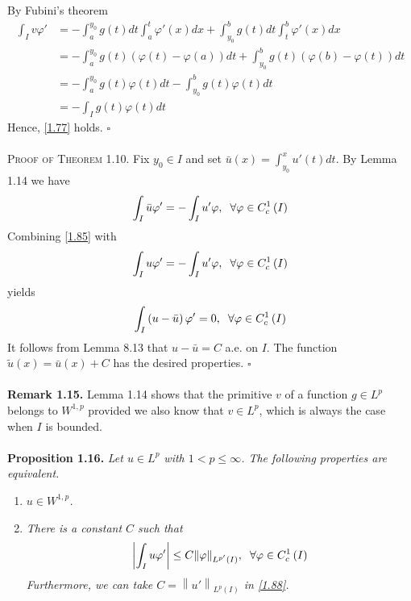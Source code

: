 \documentclass[a4paper,oneside]{article}
\numberwithin{equation}{section}
\begin{document}
By Fubini's theorem
\begin{align}
\int_I {v\varphi '}  &=  - \int_a^{{y_0}} {g\left( t \right)dt\int_a^t {\varphi '\left( x \right)dx} }  + \int_{{y_0}}^b {g\left( t \right)dt\int_t^b {\varphi '\left( x \right)dx} } \\
 &=  - \int_a^{{y_0}} {g\left( t \right)\left( {\varphi \left( t \right) - \varphi \left( a \right)} \right)dt}  + \int_{{y_0}}^b {g\left( t \right)\left( {\varphi \left( b \right) - \varphi \left( t \right)} \right)dt} \\
 &=  - \int_a^{{y_0}} {g\left( t \right)\varphi \left( t \right)dt}  - \int_{{y_0}}^b {g\left( t \right)\varphi \left( t \right)dt} \\
 &=  - \int_I {g\left( t \right)\varphi \left( t \right)dt} 
\end{align}
Hence, \eqref{1.77} holds. \hfill $\square$\\
\\
\textsc{Proof of Theorem 1.10.} Fix $y_0\in I$ and set $\bar u\left( x \right) = \int_{{y_0}}^x {u'\left( t \right)dt} $. By Lemma 1.14 we have
\begin{align}
\label{1.85}
\int_I {\bar u\varphi '}  =  - \int_I {u'\varphi } ,\hspace{0.2cm}\forall \varphi  \in C_c^1\left( I \right)
\end{align}
Combining \eqref{1.85} with 
\begin{align}
\int_I {u\varphi '}  =  - \int_I {u'\varphi } ,\hspace{0.2cm}\forall \varphi  \in C_c^1\left( I \right)
\end{align}
yields
\begin{align}
\int_I {\left( {u - \bar u} \right)\varphi '}  = 0,\hspace{0.2cm}\forall \varphi  \in C_c^1\left( I \right)
\end{align}
It follows from Lemma 8.13 that $u-\bar{u}=C$ a.e. on $I$. The function $\tilde u\left( x \right) = \bar u\left( x \right) + C$ has the desired properties. \hfill $\square$\\
\\
\textbf{Remark 1.15.} Lemma 1.14 shows that the primitive $v$ of a function $g\in L^p$ belongs to $W^{1,p}$ provided we also know that $v\in L^p$, which is always the case when $I$ is bounded.\\
\\
\textbf{Proposition 1.16.} \textit{Let $u\in L^p$ with $1<p\le \infty$. The following properties are equivalent.}
\begin{enumerate}
\item \textit{$u \in W^{1,p}$.}
\item \textit{There is a constant $C$ such that}
\begin{align}
\label{1.88}
\left| {\int_I {u\varphi '} } \right| \le C{\left\| \varphi  \right\|_{{L^{p'}}\left( I \right)}},\hspace{0.2cm}\forall \varphi  \in C_c^1\left( I \right)
\end{align}
\textit{Furthermore, we can take $C = {\left\| {u'} \right\|_{{L^p}\left( I \right)}}$ in \eqref{1.88}.}
\end{enumerate}
\end{document}
